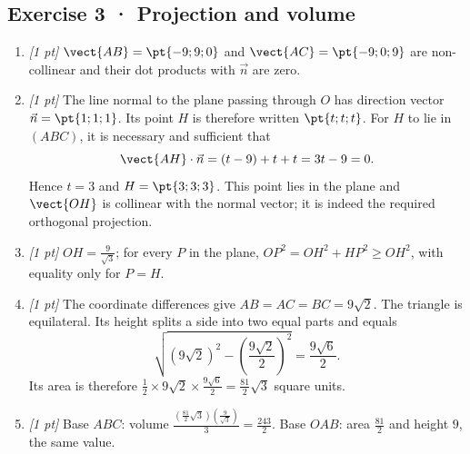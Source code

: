 \subsection*{Exercise 3 · Projection and volume}\begin{enumerate}

\item \textit{[1 pt]} $\vect{AB}=\pt{-9;9;0}$ and $\vect{AC}=\pt{-9;0;9}$ are non-collinear and their dot products with $\vec n$ are zero.

\item \textit{[1 pt]} The line normal to the plane passing through $O$ has direction vector $\vec n=\pt{1;1;1}$. Its point $H$ is therefore written $\pt{t;t;t}$. For $H$ to lie in $(ABC)$, it is necessary and sufficient that
\[\vect{AH}\cdot\vec n=(t-9)+t+t=3t-9=0.\]
Hence $t=3$ and $H=\pt{3;3;3}$. This point lies in the plane and $\vect{OH}$ is collinear with the normal vector; it is indeed the required orthogonal projection.

\item \textit{[1 pt]} $OH=\frac{9}{\sqrt{3}}$; for every $P$ in the plane, $OP^2=OH^2+HP^2\ge OH^2$, with equality only for $P=H$.

\item \textit{[1 pt]} The coordinate differences give $AB=AC=BC=9\sqrt2$. The triangle is equilateral. Its height splits a side into two equal parts and equals
\[\sqrt{(9\sqrt2)^2-(\frac{9\sqrt{2}}{2})^2}=\frac{9\sqrt6}{2}.\]
Its area is therefore $\frac12\times 9\sqrt2\times\frac{9\sqrt6}{2}=\frac{81}{2}\sqrt3$ square units.

\item \textit{[1 pt]} Base $ABC$: volume $\frac{(\frac{81}{2}\sqrt3)(\frac{9}{\sqrt{3}})}{3}=\frac{243}{2}$. Base $OAB$: area $\frac{81}{2}$ and height $9$, the same value.

\end{enumerate}


